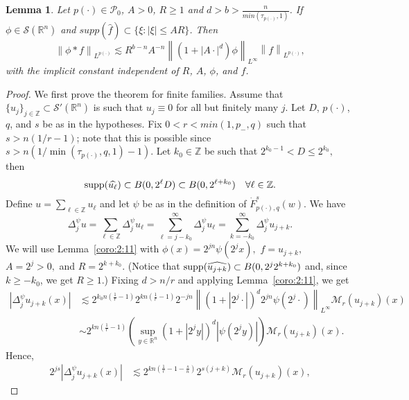 \documentclass[10pt,a4paper]{article}
\newtheorem{lemma}[theorem]{Lemma}
\theoremstyle{remark}
\newcommand{\ent}{\mathbb{Z}}
\newcommand{\rn}{{{\mathbb R}^n}}
\newcommand{\sw}{{\mathcal{S}}(\rn)}
\newcommand{\tlw}[4]{\dot F_{#1,#3}^{#2}(#4)} %
\newcommand{\Lp}{L^{p(\cdot)}} %
\newcommand{\pp}{{p(\cdot)}}
\newcommand{\M}{\mathcal{M}} %
\newcommand{\norm}[2]{\left\|#1\right\|_{#2}}
\newcommand{\supp}{{\rm{supp}}}
\newcommand{\A}{D}
\newcommand{\ex}{d}
\begin{document}
\begin{lemma}\label{lemma:variableLebesgue}
Let $p(\cdot) \in \mathcal{P}_0$, $A>0$, $R\geq 1$ and $d>b>\frac{n}{min(\tau_{p(\cdot)},1)}$. If $\phi \in \sw$ and $supp(\widehat{f}) \subset \{\xi: |\xi| \leq AR \}$. Then 
\begin{equation}
\norm{\phi \ast f}{\Lp} \lesssim R^{b-n}A^{-n}\norm{(1+|A\cdot|^d)\phi}{L^\infty}\norm{f}{\Lp},
\end{equation}
with the implicit constant independent of $R$, $A$, $\phi$, and $f$.
\end{lemma}



\begin{proof}
We first prove the theorem for finite families. Assume that $\{u_j\}_{j \in \ent} \subset \mathcal{S}'(\rn)$ is such that $u_j \equiv 0$ for all but finitely many $j$. Let $D$, $\pp$, $q$, and $s$ be as in the hypotheses. Fix $0<r<min(1,p_-,q)$ such that $s>n(1/r-1)$; note that this is possible since $s>n(1/\min(\tau_{\pp},q,1)-1)$. Let $k_0 \in \ent$ be such that $2^{k_0 -1} < \A\leq 2^{k_0},$ then  
\[
\supp(\widehat{u_\ell}) \subset B(0, 2^\ell \A) \subset B(0, 2^{\ell +k_0}) \quad \forall \ell \in \ent.
\]
Define $u =\sum_{\ell \in \ent} u_\ell$ and let $\psi$ be as in the definition of $\tlw{\pp}{s}{q}{w}$. We have
\begin{equation}\label{psi*u}
\Delta^\psi_j u = \sum_{\ell \in \ent} \Delta^\psi_j u_\ell = \sum_{\ell = j - k_0}^\infty \Delta^\psi_j  u_\ell = \sum_{k = - k_0}^\infty \Delta^\psi_j u_{j+k}.
\end{equation}
We will use Lemma~\ref{coro:2:11} with $\phi(x) =  2^{jn} \psi(2^j x),$  $f = u_{j+k},$  $A= 2^{j}>0,$ and $R= 2^{k + k_0}.$ (Notice that $\supp(\widehat{u_{j+k}}) \subset  B(0, 2^{j} 2^{k + k_0})$ and, since $k \geq -k_0$, we get $R \geq 1$.) Fixing  $\ex>n/r$ and applying Lemma~\ref{coro:2:11}, we get
\begin{align*}
|\Delta^\psi_j  u_{j+k}(x)| & \lesssim   2^{k_0n(\frac{1}{r} -1)} 2^{k n (\frac{1}{r} -1)}  2^{-jn} \norm{(1 + |2^j \cdot|)^\ex 2^{jn}\psi (2^j\cdot)}{L^\infty}  \M_r(u_{j+k})(x)\\
& \sim  2^{k n (\frac{1}{r} -1)} \left( \sup_{y \in \rn} (1 + |2^j y|)^\ex |\psi(2^j y)|\right) \M_r(u_{j+k})(x).
\end{align*}
 Hence,
\begin{align*}
2^{js}|\Delta^\psi_j  u_{j+k}(x)| & \lesssim 2^{k n (\frac{1}{r} -1-\frac{s}{n})} 2^{s(j+k)}\M_r(u_{j+k})(x),
\end{align*}

\end{proof}
\end{document}
